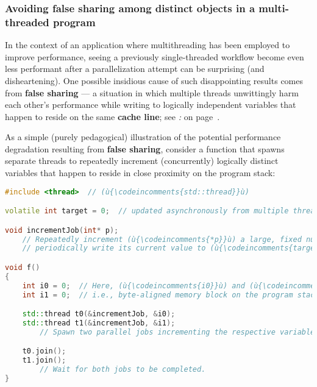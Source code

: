 \subsubsection[Avoiding \textbf{false sharing} among distinct objects in a multi-threaded program]{Avoiding \textbf{false sharing} among distinct objects in a multi-threaded program}\label{avoiding-false-sharing-among-distinct-objects-in-a-multi-threaded-program}

In the context of an application where multithreading has been employed
to improve performance, seeing
a previously single-threaded workflow become even less performant after
a parallelization attempt can be surprising (and disheartening). One possible insidious cause of such
disappointing results comes from \textbf{false sharing} --- a situation
in which multiple threads unwittingly harm each other's performance
while writing to logically independent variables that happen to reside
on the same \textbf{cache line}; see {\it {}:} {\it{}} on page~\pageref{cache-lines,-l1,-l2,-and-l3-cache,-pages,-and-virtual-memory}.

As a simple (purely pedagogical) illustration of the potential
performance degradation resulting from \textbf{false sharing}, consider
a function that spawns separate threads to repeatedly increment
(concurrently) logically distinct variables that happen to reside in
close proximity on the program stack:

\begin{lstlisting}[language=C++]
#include <thread>  // (ù{\codeincomments{std::thread}}ù)

volatile int target = 0;  // updated asynchronously from multiple threads

void incrementJob(int* p);
    // Repeatedly increment (ù{\codeincomments{*p}}ù) a large, fixed number of times;
    // periodically write its current value to (ù{\codeincomments{target}}ù).

void f()
{
    int i0 = 0;  // Here, (ù{\codeincomments{i0}}ù) and (ù{\codeincomments{i1}}ù) likely share the same cache line,
    int i1 = 0;  // i.e., byte-aligned memory block on the program stack.

    std::thread t0(&incrementJob, &i0);
    std::thread t1(&incrementJob, &i1);
        // Spawn two parallel jobs incrementing the respective variables.

    t0.join();
    t1.join();
        // Wait for both jobs to be completed.
}
\end{lstlisting}

